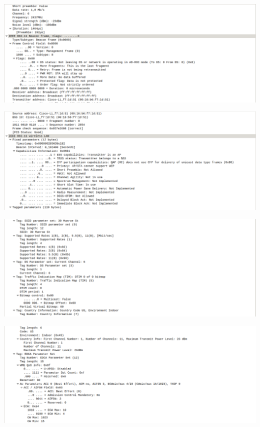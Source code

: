 \documentclass{article}
\begin{document}
\begin{center}
\includegraphics[scale=0.3]{WLAN/correcto4.png}
\end{center}
\begin{center}
\includegraphics[scale=0.3]{WLAN/correcto5.png}
\end{center}
\begin{center}
\includegraphics[scale=0.3]{WLAN/correcto6.png}
\end{center}
\begin{center}
\includegraphics[scale=0.3]{WLAN/correcto7.png}
\end{center}
\end{document}
